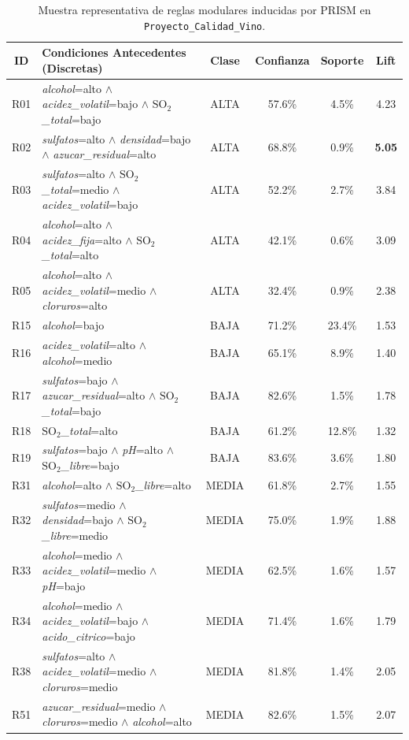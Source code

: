 \documentclass{article}
\begin{document}
\begin{table}[H]
\centering
\caption{Muestra representativa de reglas modulares inducidas por PRISM en \texttt{Proyecto\_Calidad\_Vino}.}
\label{tab:anexo_reglas}
\small
\begin{tabularx}{\textwidth}{cp{7.2cm}cccc}
\toprule
\textbf{ID} & \textbf{Condiciones Antecedentes (Discretas)} & \textbf{Clase} & \textbf{Confianza} & \textbf{Soporte} & \textbf{Lift} \\
\midrule
R01 & \textit{alcohol}=alto $\land$ \textit{acidez\_volatil}=bajo $\land$ $\text{SO}_2$\textit{\_total}=bajo & ALTA & 57.6\% & 4.5\% & 4.23 \\
R02 & \textit{sulfatos}=alto $\land$ \textit{densidad}=bajo $\land$ \textit{azucar\_residual}=alto & ALTA & 68.8\% & 0.9\% & \textbf{5.05} \\
R03 & \textit{sulfatos}=alto $\land$ $\text{SO}_2$\textit{\_total}=medio $\land$ \textit{acidez\_volatil}=bajo & ALTA & 52.2\% & 2.7\% & 3.84 \\
R04 & \textit{alcohol}=alto $\land$ \textit{acidez\_fija}=alto $\land$ $\text{SO}_2$\textit{\_total}=alto & ALTA & 42.1\% & 0.6\% & 3.09 \\
R05 & \textit{alcohol}=alto $\land$ \textit{acidez\_volatil}=medio $\land$ \textit{cloruros}=alto & ALTA & 32.4\% & 0.9\% & 2.38 \\
\midrule
R15 & \textit{alcohol}=bajo & BAJA & 71.2\% & 23.4\% & 1.53 \\
R16 & \textit{acidez\_volatil}=alto $\land$ \textit{alcohol}=medio & BAJA & 65.1\% & 8.9\% & 1.40 \\
R17 & \textit{sulfatos}=bajo $\land$ \textit{azucar\_residual}=alto $\land$ $\text{SO}_2$\textit{\_total}=bajo & BAJA & 82.6\% & 1.5\% & 1.78 \\
R18 & $\text{SO}_2$\textit{\_total}=alto & BAJA & 61.2\% & 12.8\% & 1.32 \\
R19 & \textit{sulfatos}=bajo $\land$ \textit{pH}=alto $\land$ $\text{SO}_2$\textit{\_libre}=bajo & BAJA & 83.6\% & 3.6\% & 1.80 \\
\midrule
R31 & \textit{alcohol}=alto $\land$ $\text{SO}_2$\textit{\_libre}=alto & MEDIA & 61.8\% & 2.7\% & 1.55 \\
R32 & \textit{sulfatos}=medio $\land$ \textit{densidad}=bajo $\land$ $\text{SO}_2$\textit{\_libre}=medio & MEDIA & 75.0\% & 1.9\% & 1.88 \\
R33 & \textit{alcohol}=medio $\land$ \textit{acidez\_volatil}=medio $\land$ \textit{pH}=bajo & MEDIA & 62.5\% & 1.6\% & 1.57 \\
R34 & \textit{alcohol}=medio $\land$ \textit{acidez\_volatil}=bajo $\land$ \textit{acido\_citrico}=bajo & MEDIA & 71.4\% & 1.6\% & 1.79 \\
R38 & \textit{sulfatos}=alto $\land$ \textit{acidez\_volatil}=medio $\land$ \textit{cloruros}=medio & MEDIA & 81.8\% & 1.4\% & 2.05 \\
R51 & \textit{azucar\_residual}=medio $\land$ \textit{cloruros}=medio $\land$ \textit{alcohol}=alto & MEDIA & 82.6\% & 1.5\% & 2.07 \\
\bottomrule
\end{tabularx}
\end{table}
\end{document}
